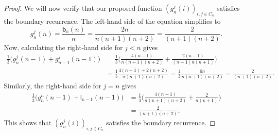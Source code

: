 \documentclass[11pt]{article}
\newcommand{\sgrleft}[2]{\mathsf{l}_{#1}(#2)}
\newcommand{\sgrboth}[2]{\mathsf{b}_{#1}(#2)}
\begin{document}
\begin{proof}
    We will now verify that our proposed function $(g_n^j(i))_{i,j\in C_n}$ satisfies the boundary recurrence. The left-hand side of the equation simplifies to
    $$g_n^j(n) = \frac{\sgrboth{n}{n}}{n} = \frac{2n}{n(n+1)(n+2)} = \frac{2}{(n+1)(n+2)}.$$
    Now, calculating the right-hand side for $j < n$ gives
    \begin{align*}
        \frac{1}{3} \bigg( g_n^j(n-1) + g_{n-1}^j(n-1)\bigg) &= \frac{1}{3} \bigg(\frac{4(n-1)}{n(n+1)(n+2)} + \frac{2(n-1)}{(n-1)n(n+1)}\bigg)\\ &= \frac{1}{3} \frac{4(n-1) + 2(n+2)}{n(n+1)(n+2)}  = \frac{1}{3} \frac{6n}{n(n+1)(n+2)}  = \frac{2}{(n+1)(n+2)}. 
    \end{align*} 
    Similarly, the right-hand side for $j = n$ gives
    \begin{align*}
        \frac{1}{3} \bigg( g_n^n(n-1) + \sgrleft{n-1}{n-1}\bigg) &= \frac{1}{3} \bigg(\frac{4(n-1)}{n(n+1)(n+2)} + \frac{2}{n(n+1)}\bigg)\\ &= \frac{2}{(n+1)(n+2)}. 
    \end{align*} 
    This shows that $(g_n^j(i))_{i,j\in C_n}$ satisfies the boundary recurrence.
    

\end{proof}
\end{document}
